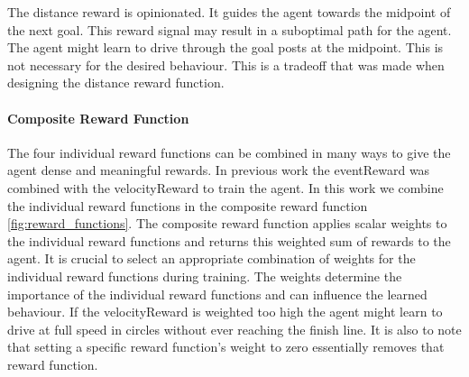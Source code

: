 The distance reward is opinionated. It guides the agent towards the midpoint of the next goal. This reward signal may result in a suboptimal path for the agent. The agent might learn to drive through the goal posts at the midpoint. This is not necessary for the desired behaviour. This is a tradeoff that was made when designing the distance reward function.

\paragraph{Composite Reward Function}
The four individual reward functions can be combined in many ways to give the agent dense and meaningful rewards. In previous work the eventReward was combined with the velocityReward to train the agent. In this work we combine the individual reward functions in the composite reward function \ref{fig:reward_functions}. The composite reward function applies scalar weights to the individual reward functions and returns this weighted sum of rewards to the agent. It is crucial to select an appropriate combination of weights for the individual reward functions during training. The weights determine the importance of the individual reward functions and can influence the learned behaviour. If the velocityReward is weighted too high the agent might learn to drive at full speed in circles without ever reaching the finish line. It is also to note that setting a specific reward function's weight to zero essentially removes that reward function.

